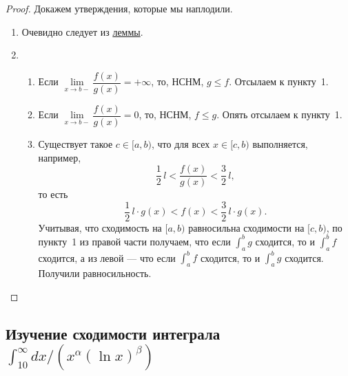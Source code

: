 \begin{proof}
	Докажем утверждения, которые мы наплодили.
	\begin{enumerate}
		\item Очевидно следует из \hyperlink{srshlem}{леммы}.
		\item
		\begin{enumerate}
			\item Если \(\lim\limits_{x \to b-} \dfrac{f(x)}{g(x)} = +\infty\), то, НСНМ, \(g \leqslant f\). Отсылаем к пункту~1.
			\item Если \(\lim\limits_{x \to b-} \dfrac{f(x)}{g(x)} = 0\), то, НСНМ, \(f \leqslant g\). Опять отсылаем к пункту~1.
			\item Существует такое \(c \in [a, b)\), что для всех \(x \in [c, b)\) выполняется, 	например, \[
			\frac{1}{2} \, l < \frac{f(x)}{g(x)} < \frac{3}{2} \, l,
			\]
			то есть \[
			\frac{1}{2} \, l  \cdot g(x) < f(x) < \frac{3}{2} \, l \cdot g(x).
			\]
			Учитывая, что сходимость на \([a, b)\) равносильна сходимости на \([c, b)\), по пункту~1 из правой части получаем, что если \(\int_a^b g\) сходится, то и \(\int_a^b f\) сходится, а из левой --- что если \(\int_a^b f\) сходится, то и \(\int_a^b g\) сходится. Получили равносильность.
		\end{enumerate}
	\end{enumerate}
\end{proof}

\subsection{Изучение сходимости интеграла $\int_{10}^\infty dx/(x^\alpha (\ln x)^\beta)$}

